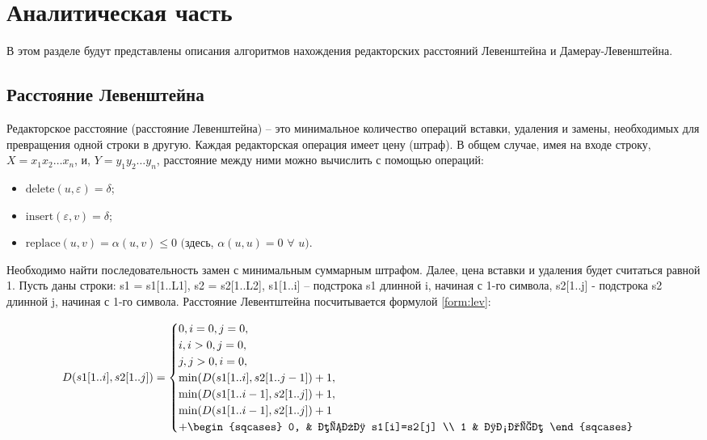 \chapter{Аналитическая часть}

В этом разделе будут представлены описания алгоритмов нахождения редакторских расстояний Левенштейна и Дамерау-Левенштейна.

\section{Расстояние Левенштейна}

Редакторское расстояние (расстояние Левенштейна) -- это минимальное количество операций вставки, удаления и замены, необходимых для превращения одной строки в другую.
Каждая редакторская операция имеет цену (штраф). 
В общем случае, имея на входе строку, $X = x_1x_2 \dots x_n$, и, $Y = y_1y_2 \dots y_n$, расстояние между ними можно вычислить с помощью операций:

\begin{itemize}
	\item ${\text{delete}(u, \varepsilon) = \delta}$;
    \item $\text{insert}(\varepsilon, v) = \delta$;
    \item $\text{replace}(u, v) = \alpha(u, v) \leq 0$  $($здесь, $\alpha(u, u) = 0$ $\forall$ $u).$
\end{itemize}

Необходимо найти последовательность замен с минимальным суммарным штрафом.
Далее, цена вставки и удаления будет считаться равной 1.
Пусть даны строки: s1 = s1[1..L1], s2 = s2[1..L2], s1[1..i] -- подстрока s1 длинной i, начиная с 1-го символа, s2[1..j] - подстрока s2 длинной j, начиная с 1-го символа.
Расстояние Левентштейна посчитывается формулой \ref{form:lev}:

\begin{equation}
    \label{form:lev}
	D(s1[1..i], s2[1..j]) =
	\begin{cases}
		0,        i = 0, j =0,\\
		i,   i > 0, j =0, \\
		j,  j > 0, i = 0, \\
		\min(D(s1[1..i], s2[1..j-1]) + 1,\\ 
		\min(D(s1[1..i-1], s2[1..j]) + 1, \\
		\min(D(s1[1..i-1], s2[1..j]) + 1 \\ + 
		\begin{sqcases}
			0, & если s1[i]=s2[j] \\
			1 & иначе
		\end{sqcases}
	\end{cases}
\end{equation}


